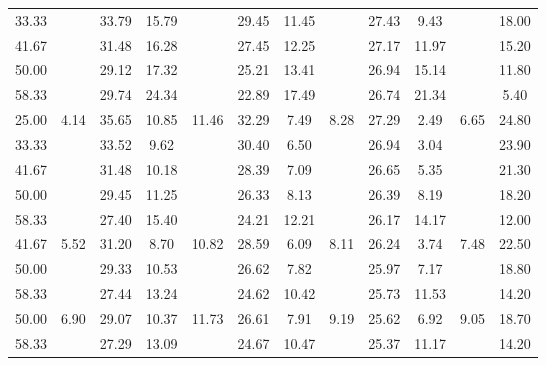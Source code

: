 \begin{table}
\begin{center}
\begin{tabular}{cccccccccccc}
		33.33	&&33.79	&15.79	&&29.45	&11.45	&&27.43	&9.43	&&18.00\\
		41.67	&&31.48	&16.28	&&27.45	&12.25	&&27.17	&11.97	&&15.20\\
		50.00	&&29.12	&17.32	&&25.21	&13.41	&&26.94	&15.14	&&11.80\\
		58.33	&&29.74	&24.34	&&22.89	&17.49	&&26.74	&21.34	&&5.40\\
		\midrule
		25.00	&\multirow{5}{*}{4.14}	&35.65	&10.85	&\multirow{5}{*}{11.46}	&32.29	&7.49	&\multirow{5}{*}{8.28}	&27.29	&2.49	&\multirow{5}{*}{6.65}	&24.80\\
		33.33	&&33.52	&9.62	&&30.40	&6.50	&&26.94	&3.04	&&23.90\\
		41.67	&&31.48	&10.18	&&28.39	&7.09	&&26.65	&5.35	&&21.30\\
		50.00	&&29.45	&11.25	&&26.33	&8.13	&&26.39	&8.19	&&18.20\\
		58.33	&&27.40	&15.40	&&24.21	&12.21	&&26.17	&14.17	&&12.00\\
		\midrule
		41.67	&\multirow{3}{*}{5.52}	&31.20	&8.70	&\multirow{3}{*}{10.82}	&28.59	&6.09	&\multirow{3}{*}{8.11}	&26.24	&3.74	&\multirow{3}{*}{7.48}	&22.50\\
		50.00	&&29.33	&10.53	&&26.62	&7.82	&&25.97	&7.17	&&18.80\\
		58.33	&&27.44	&13.24	&&24.62	&10.42	&&25.73	&11.53	&&14.20\\
		\midrule
		50.00	&\multirow{2}{*}{6.90}	&29.07	&10.37	&\multirow{2}{*}{11.73}	&26.61	&7.91	&\multirow{2}{*}{9.19}	&25.62	&6.92	&\multirow{2}{*}{9.05}		&18.70\\
		58.33	&&27.29	&13.09	&&24.67	&10.47	&&25.37	&11.17	&&14.20\\
		\bottomrule
	\end{tabular}
	\end{center}
	\label{tab:EfficiencyComparison}
\end{table}

